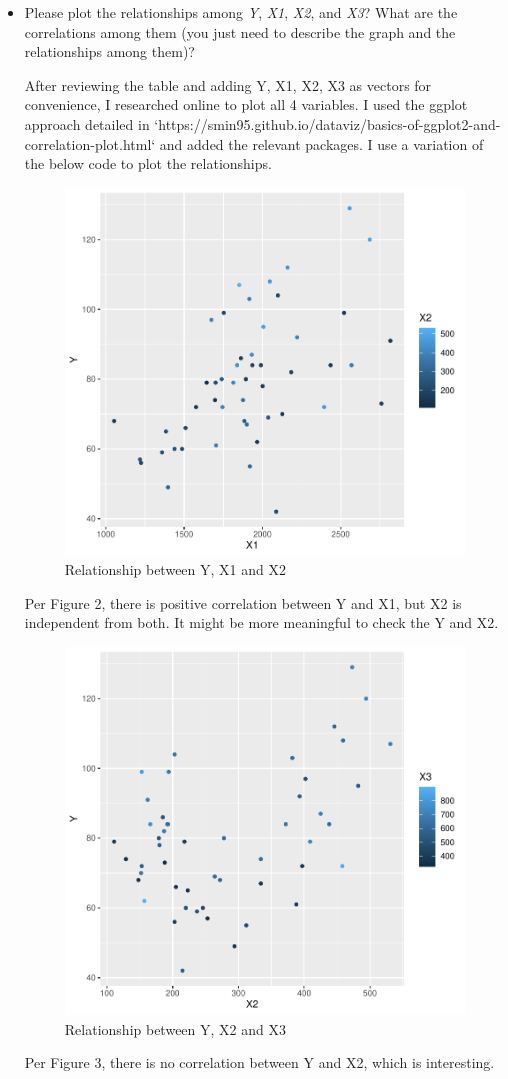 \documentclass[12pt,letterpaper]{article}
\begin{document}
\begin{enumerate}
\begin{itemize}
\item
Please plot the relationships among \emph{Y}, \emph{X1}, \emph{X2}, and \emph{X3}? What are the correlations among them (you just need to describe the graph and the relationships among them)?
\vspace{.5cm}

\noindent After reviewing the table and adding Y, X1, X2, X3 as vectors for convenience, I researched online to plot all 4 variables. I used the ggplot approach detailed in `https://smin95.github.io/dataviz/basics-of-ggplot2-and-correlation-plot.html` and added the relevant packages. I use a variation of the below code to plot the relationships.\\
 
\vspace{.5cm}


	\begin{figure}[h]\centering
		\caption{\footnotesize Relationship between Y, X1 and X2}
		\label{fig:plot_2}
		\includegraphics[width=.25\textwidth]{plot2.pdf}
	\end{figure}
	
	
\noindent Per Figure 2, there is positive correlation between Y and X1, but X2 is independent from both. It might be more meaningful to check the Y and X2. \\


				\begin{figure}[h]\centering
					\caption{\footnotesize Relationship between Y, X2 and X3}
					\label{fig:plot_3}
					\includegraphics[width=.25\textwidth]{plot3.pdf}
				\end{figure}
				
				
	
\noindent Per Figure 3, there is no correlation between Y and X2, which is interesting. \\



\end{itemize}
\end{enumerate}
\end{document}
